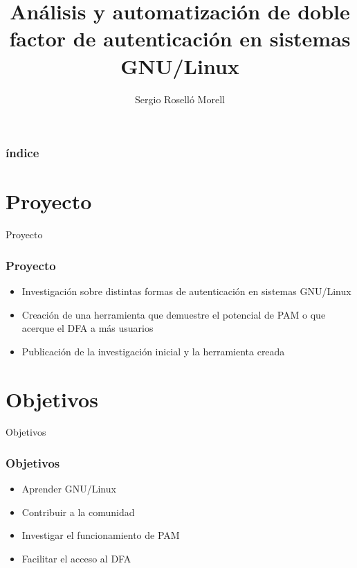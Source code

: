\documentclass{beamer}
\title{Análisis y automatización de doble factor de autenticación en sistemas GNU/Linux}
\author{Sergio Roselló Morell}
\begin{document}
\frame{\titlepage}

\begin{frame}
\frametitle{índice}
\tableofcontents
\end{frame}
\section{Proyecto}
\begin{frame}{Proyecto}
	\frametitle{Proyecto}
	\begin{itemize}
		\item Investigación sobre distintas formas de autenticación en sistemas GNU/Linux
		\vspace{0.7cm}
		\item Creación de una herramienta que demuestre el potencial de PAM o que acerque el DFA a más usuarios
		\vspace{0.7cm}
		\item Publicación de la investigación inicial y la herramienta creada
	\end{itemize}
\end{frame}
\section{Objetivos}
\begin{frame}{Objetivos}
	\frametitle{Objetivos}
	{
	\begin{itemize}
		\item Aprender GNU/Linux
		\item Contribuir a la comunidad
		\item Investigar el funcionamiento de PAM
		\item Facilitar el acceso al DFA
	\end{itemize}
	\\}
\end{frame}
\end{document}
